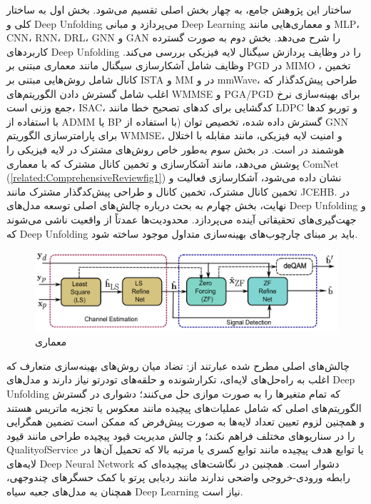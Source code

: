 ساختار این پژوهش جامع، به چهار بخش اصلی تقسیم می‌شود. بخش اول به ساختار کلی 
و 
\gls{Deep Unfolding}
می‌پردازد و مبانی 
\gls{Deep Learning}
و معماری‌هایی مانند
\gls{MLP}، \gls{CNN}، \gls{RNN}، \gls{DRL}، \gls{GNN}
و
\gls{GAN} 
را شرح می‌دهد. بخش دوم به صورت گسترده کاربردهای 
\gls{Deep Unfolding}
را در وظایف پردازش سیگنال لایه فیزیکی بررسی می‌کند.  وظایف شامل آشکارسازی سیگنال مانند معماری 
مبتنی بر 
\gls{PGD}
در 
\gls{MIMO}  
، تخمین کانال شامل روش‌هایی مبتنی بر 
\gls{ISTA}
و 
\gls{MM}
در 
و 
\gls{mmWave}،
طراحی پیش‌کدگذار که اغلب شامل گسترش دادن الگوریتم‌های 
\gls{WMMSE}
و 
\gls{PGA}/\gls{PGD}
برای بهینه‌سازی نرخ جمع وزنی است، 
\gls{ISAC}،
کدگشایی برای کدهای تصحیح خطا مانند 
\gls{LDPC}
و توربو کدها با استفاده از 
\gls{ADMM}
یا 
\gls{BP}
گسترش داده شده، تخصیص توان (با استفاده از 
\gls{GNN}
برای پارامترسازی الگوریتم 
\gls{WMMSE}،
و امنیت لایه فیزیکی، مانند مقابله با اختلال هوشمند در 
است. در بخش سوم به‌طور خاص روش‌های مشترک در لایه فیزیکی را پوشش می‌دهد، مانند آشکارسازی و تخمین کانال مشترک که با معماری ComNet 
(\autoref{related:ComprehensiveReviewfig1})
 نشان داده می‌شود، آشکارسازی فعالیت و تخمین کانال مشترک، تخمین کانال و طراحی پیش‌کدگذار مشترک مانند 
\gls{JCEHB}.
در نهایت، بخش چهارم به بحث درباره چالش‌های اصلی توسعه مدل‌های 
\gls{Deep Unfolding}
و جهت‌گیری‌های تحقیقاتی آینده می‌پردازد.  محدودیت‌ها عمدتاً از  واقعیت ناشی می‌شوند که 
\gls{Deep Unfolding}
باید بر مبنای چارچوب‌های بهینه‌سازی متداول موجود ساخته شود.
\begin{figure}
	\centering
	\includegraphics[width=0.7\linewidth]{./Pic/ComprehensiveReview_related_fig1}
	\caption[ معماری ]{معماری  \cite{ComprehensiveReview}}
	\label{related:ComprehensiveReviewfig1}
\end{figure}
چالش‌های اصلی مطرح شده عبارتند از: تضاد میان روش‌های بهینه‌سازی متعارف که اغلب به راه‌حل‌های لایه‌ای، تکرارشونده و حلقه‌های تودرتو نیاز دارند و مدل‌های 
\gls{Deep Unfolding}
که تمام متغیرها را به صورت موازی حل می‌کنند؛ دشواری در گسترش الگوریتم‌های اصلی که شامل عملیات‌های پیچیده مانند معکوس یا تجزیه ماتریس هستند و همچنین لزوم تعیین تعداد لایه‌ها به صورت پیش‌فرض که ممکن است تضمین همگرایی را در سناریوهای مختلف فراهم نکند؛ و چالش مدیریت قیود پیچیده طراحی مانند قیود 
\gls{QualityofService}
یا توابع هدف پیچیده مانند توابع کسری یا مرتبه بالا که تحمیل آن‌ها در لایه‌های 
\gls{Deep Neural Network}
دشوار است. همچنین در نگاشت‌های پیچیده‌ای که رابطه ورودی-خروجی واضحی ندارند مانند ردیابی پرتو با کمک حسگرهای چندوجهی، همچنان به مدل‌های جعبه سیاه 
\gls{Deep Learning}
نیاز است.

